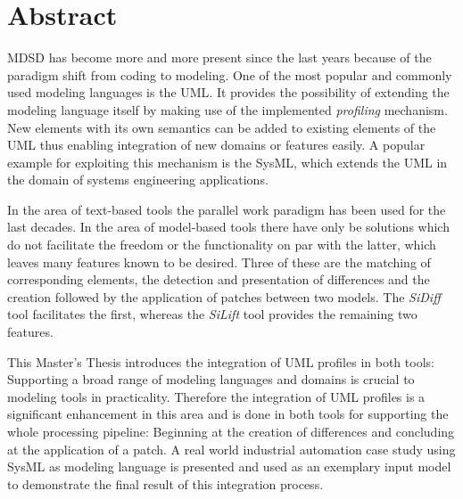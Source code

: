 \chapter*{Abstract}\label{abstract}
\ac{MDSD} has become more 
and more present since the last years because of the paradigm shift
from coding to modeling. 
One of the most popular and commonly used modeling languages is the \ac{UML}. It
provides the possibility of extending the modeling language itself by
making use of the implemented \textit{profiling} mechanism. New elements with its own semantics can be added to
existing elements of the \ac{UML} thus enabling integration of new domains or
features easily.
A popular example for exploiting this mechanism is the \ac{SysML}, which extends the \ac{UML}
in the domain of systems engineering applications.

In the area of text-based tools the parallel work
paradigm has been used for the last decades. In the area of
model-based tools there have only be solutions which do not facilitate the freedom
or the functionality on par with the latter, which leaves many
features known to be desired. Three of these are the matching of corresponding
elements, the detection and presentation of differences and the creation
followed by the application of patches between two models.
The \textit{SiDiff} tool facilitates the first, whereas the
\textit{SiLift} tool provides the remaining two features.

This Master's Thesis introduces the integration of \ac{UML} profiles in both
tools:\\
Supporting a broad range of modeling languages and domains is crucial to
modeling tools in practicality. Therefore the integration of \ac{UML} profiles
is a significant enhancement in this area and is done in both tools for
supporting the whole processing pipeline: Beginning at the creation
of differences and concluding at the application of a patch.
A real world industrial automation case study using \ac{SysML} as modeling
language is presented and used as an exemplary input model to demonstrate the
final result of this integration process.
